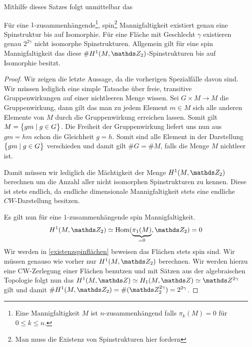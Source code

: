 Mithilfe dieses Satzes folgt unmittelbar das
\begin{Kor}\label{kor:anzahlSpin}
	Für eine $ 1 $-zusammenhängende\footnote{Eine Mannigfaltigkeit $ M $ ist $ n $-zusammenhängend falls $ \pi_k(M)=0 $ für $ 0\leq k\leq n $.}, spin\footnote{Man muss die Existenz von Spinstrukturen hier fordern} Mannigfaltigkeit existiert genau eine Spinstruktur bis auf Isomorphie. Für eine Fläche mit Geschlecht $ \gamma $ existieren
	genau $ 2^{2\gamma} $ nicht isomorphe Spinstrukturen. Allgemein
	gilt für eine spin Mannigfaltigkeit das diese $ \# H^1(M,\Z_2) $-Spinstrukturen bis auf Isomorphie besitzt.
	\begin{proof}
		Wir zeigen die letzte Aussage, da die vorherigen Spezialfälle
		davon sind. Wir müssen lediglich eine simple Tatsache über
		freie, transitive Gruppenwirkungen auf einer nichtleeren Menge wissen. Sei $ G\times M \longrightarrow M $ die Gruppenwirkung,
		dann gilt das man zu jedem Element $ m\in M $ sich alle
		anderen Elemente von $ M $ durch die Gruppenwirkung erreichen lassen. Somit gilt $ M = \bigl\{ gm \; | \; g\in G \bigr\} $. Die Freiheit
		der Gruppenwirkung liefert uns nun aus $ gm=hm $ schon die 
		Gleichheit $ g=h $. Somit sind alle Element in der Darstellung
		$ \bigl\{ gm \; | \; g\in G \bigr\} $ verschieden und damit gilt $ \# G = \# M $,
		falls die Menge $ M $ nichtleer ist.
		
		Damit müssen wir lediglich die Mächtigkeit der Menge $ H^1(M,\Z_2) $
		berechnen um die Anzahl aller nicht isomorphen Spinstrukturen zu kennen. Diese ist stets endlich, da endliche dimensionale Mannigfaltigkeit stets eine endliche $ CW $-Darstellung besitzen.
		
		Es gilt nun für eine $ 1 $-zusammenhängende spin Mannigfaltigkeit.
		\begin{gather*}
			H^1(M,\Z_2)\simeq \Hom(\underbrace{\pi_1(M)}_{=0},\Z_2)=0 
		\end{gather*}
		Wir werden in \cref{existenzspinflächen} beweisen das Flächen
		stets spin sind. Wir müssen genauso wie vorher nur $ H^1(M,\Z_2) $
		berechnen. Wir werden hierzu eine CW-Zerlegung einer Flächen
		benutzen und mit Sätzen aus der algebraischen Topologie folgt nun
		das $ H^1(M,\Z) \simeq H_1(M,\Z)\simeq\Z^{2\gamma} $ gilt und damit 
		$ \# H^1(M,\Z_2) = \# (\Z_2^{2\gamma})  = 2^{2\gamma}$.
		

\end{proof}
\end{Kor}
